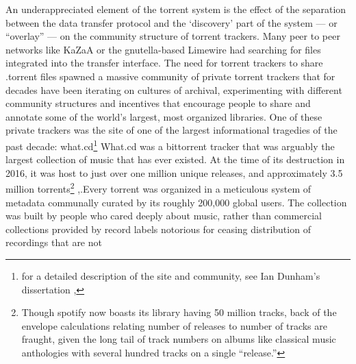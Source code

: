 \documentclass{article}
\begin{document}
An underappreciated element of the torrent system is the effect of the
separation between the data transfer protocol and the `discovery' part
of the system --- or ``overlay'' --- on the community structure of
torrent trackers. Many peer to peer networks like KaZaA or the
gnutella-based Limewire had searching for files integrated into the
transfer interface. The need for torrent trackers to share .torrent
files spawned a massive community of private torrent trackers that for
decades have been iterating on cultures of archival, experimenting with
different community structures and incentives that encourage people to
share and annotate some of the world's largest, most organized
libraries. One of these private trackers was the site of one of the
largest informational tragedies of the past decade: what.cd\footnote{for
  a detailed description of the site and community, see Ian Dunham's
  dissertation \cite{dunhamWhatCDLegacy2018},}
What.cd was a bittorrent tracker that was arguably the largest
collection of music that has ever existed. At the time of its
destruction in 2016, it was host to just over one million unique
releases, and approximately 3.5 million torrents\footnote{Though spotify
  now boasts its library having 50 million tracks, back of the envelope
  calculations relating number of releases to number of tracks are
  fraught, given the long tail of track numbers on albums like classical
  music anthologies with several hundred tracks on a single ``release.''}
\cite{dunhamWhatCDLegacy2018},.Every torrent was organized in a
meticulous system of metadata communally curated by its roughly 200,000
global users. The collection was built by people who cared deeply about
music, rather than commercial collections provided by record labels
notorious for ceasing distribution of recordings that are not
\end{document}
